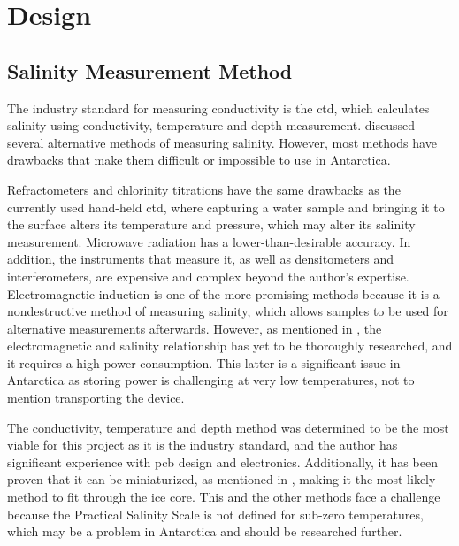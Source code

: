 
\chapter{Design}\label{ch:design}

\section{Salinity Measurement Method}

The industry standard for measuring conductivity is the \gls{ctd}, which calculates salinity using conductivity, temperature and depth measurement.
 discussed several alternative methods of measuring salinity.
However, most methods have drawbacks that make them difficult or impossible to use in Antarctica.

Refractometers and chlorinity titrations have the same drawbacks as the currently used hand-held \gls{ctd}, where capturing a water sample and bringing it to the surface alters its temperature and pressure, which may alter its salinity measurement.
Microwave radiation has a lower-than-desirable accuracy.
In addition, the instruments that measure it, as well as densitometers and interferometers, are expensive and complex beyond the author's expertise.
Electromagnetic induction is one of the more promising methods because it is a nondestructive method of measuring salinity, which allows samples to be used for alternative measurements afterwards.
However, as mentioned in , the electromagnetic and salinity relationship has yet to be thoroughly researched, and it requires a high power consumption.
This latter is a significant issue in Antarctica as storing power is challenging at very low temperatures, not to mention transporting the device.

The conductivity, temperature and depth method was determined to be the most viable for this project as it is the industry standard, and the author has significant experience with \gls{pcb} design and electronics.
Additionally, it has been proven that it can be miniaturized, as mentioned in , making it the most likely method to fit through the ice core.
This and the other methods face a challenge because the Practical Salinity Scale is not defined for sub-zero temperatures, which may be a problem in Antarctica and should be researched further.

